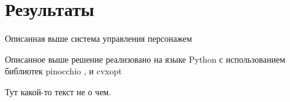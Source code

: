 \section{Результаты}

Описанная выше система управления персонажем

Описанное выше решение реализовано на языке Python с использованием библиотек pinocchio \cite{Carpentier}, \cite{Pinocchio} и cvxopt \cite{CVXOPT}

Тут какой-то текст не о чем.


